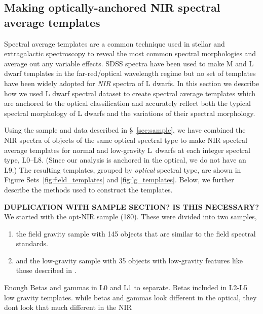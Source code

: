 \documentclass[12pt,preprint]{aastex}
\begin{document}
\clearpage
\subsection{Making optically-anchored NIR spectral average templates}
\label{sec:templates}

Spectral average templates are a common technique used in stellar and extragalactic spectroscopy to reveal the most common spectral morphologies and average out any variable effects.
SDSS spectra have been used to make M and L dwarf templates in the far-red/optical wavelength regime \cite{Bochanski07_templates, Schmidt:2014jc} but no set of templates have been widely adopted for \emph{NIR} spectra of L dwarfs.
In this section we describe how we used L dwarf spectral dataset to create spectral average templates which are anchored to the optical classification and accurately reflect both the typical spectral morphology of L dwarfs and the variations of their spectral morphology.

Using the sample and data described in \S~\ref{sec:sample}, we have combined the NIR spectra of objects of the same optical spectral type to make NIR spectral average templates for normal and low-gravity L~dwarfs at each integer spectral type, L0--L8. (Since our analysis is anchored in the optical, we do not have an L9.) The resulting templates, grouped by \emph{optical} spectral type, are shown in Figure Sets~\ref{fig:field_templates} and \ref{fig:lg_templates}.
Below, we further describe the methods used to construct the templates.

\textbf{DUPLICATION WITH SAMPLE SECTION? IS THIS NECESSARY?}\\
We started with the opt-NIR sample (180). 
These were divided into two samples, 
\begin{enumerate} \itemsep1pt \parskip0pt 
	\item the field gravity sample with 145 objects that are similar to the \citet{K99} field spectral standards.
	\item and the low-gravity sample with 35 objects with low-gravity features like those described in \citet{Cruz09_lowg}.
\end{enumerate}

Enough Betas and gammas in L0 and L1 to separate.
Betas included in L2-L5 low gravity templates.
while betas and gammas look different in the optical, they dont look that much different in the NIR
\end{document}
